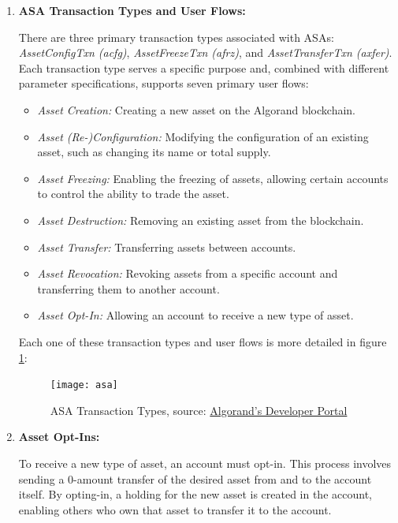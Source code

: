\begin{enumerate}
    \item \textbf{ASA Transaction Types and User Flows:}

    There are three primary transaction types associated with ASAs: \textit{AssetConfigTxn (acfg)}, \textit{AssetFreezeTxn (afrz)}, and \textit{AssetTransferTxn (axfer)}. Each transaction type serves a specific purpose and, combined with different parameter specifications, supports seven primary user flows:

    \begin{itemize}
        \item \textit{Asset Creation:} Creating a new asset on the Algorand blockchain.
        \item \textit{Asset (Re-)Configuration:} Modifying the configuration of an existing asset, such as changing its name or total supply.
        \item \textit{Asset Freezing:} Enabling the freezing of assets, allowing certain accounts to control the ability to trade the asset.
        \item \textit{Asset Destruction:} Removing an existing asset from the blockchain.
        \item \textit{Asset Transfer:} Transferring assets between accounts.
        \item \textit{Asset Revocation:} Revoking assets from a specific account and transferring them to another account.
        \item \textit{Asset Opt-In:} Allowing an account to receive a new type of asset.
    \end{itemize}

    Each one of these transaction types and user flows is more detailed in figure \ref{fig:asa}:

    \begin{figure}[htbp]
	   \centering
	   \texttt{[image: asa]}  %
	   \caption{ASA Transaction Types, source: \href{https://developer.algorand.org/articles/algorand-standard-assets/}{Algorand's Developer Portal}}
	   \label{fig:asa}
    \end{figure}

    
    \item \textbf{Asset Opt-Ins:}

    To receive a new type of asset, an account must opt-in. This process involves sending a 0-amount transfer of the desired asset from and to the account itself. By opting-in, a holding for the new asset is created in the account, enabling others who own that asset to transfer it to the account.


\end{enumerate}
